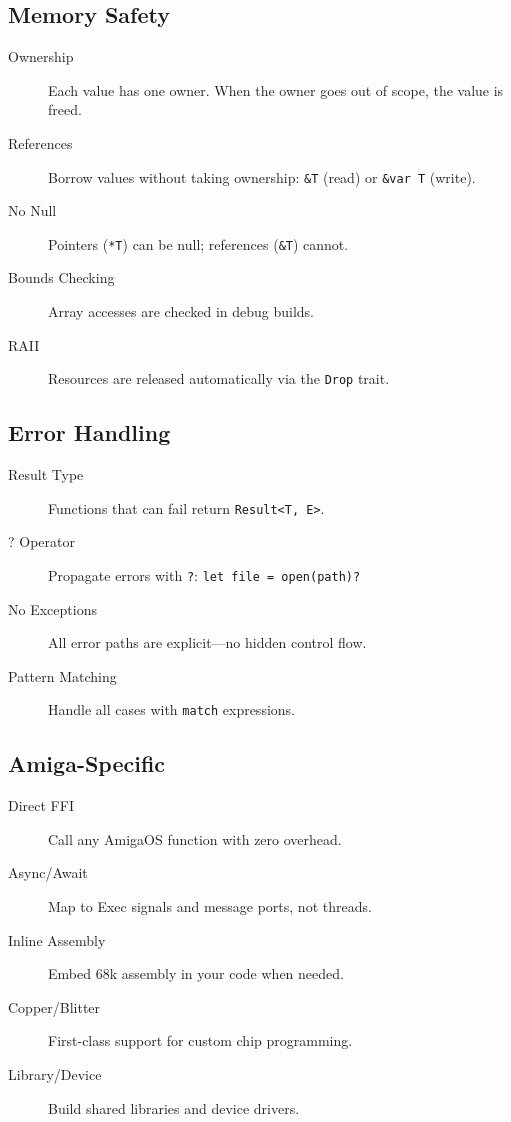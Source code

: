 \subsection{Memory Safety}

\begin{description}
    \item[Ownership] Each value has one owner. When the owner goes out of scope, the value is freed.
    \item[References] Borrow values without taking ownership: \texttt{\&T} (read) or \texttt{\&var T} (write).
    \item[No Null] Pointers (\texttt{*T}) can be null; references (\texttt{\&T}) cannot.
    \item[Bounds Checking] Array accesses are checked in debug builds.
    \item[RAII] Resources are released automatically via the \texttt{Drop} trait.
\end{description}

\subsection{Error Handling}

\begin{description}
    \item[Result Type] Functions that can fail return \texttt{Result<T, E>}.
    \item[? Operator] Propagate errors with \texttt{?}: \texttt{let file = open(path)?}
    \item[No Exceptions] All error paths are explicit---no hidden control flow.
    \item[Pattern Matching] Handle all cases with \texttt{match} expressions.
\end{description}

\subsection{Amiga-Specific}

\begin{description}
    \item[Direct FFI] Call any AmigaOS function with zero overhead.
    \item[Async/Await] Map to Exec signals and message ports, not threads.
    \item[Inline Assembly] Embed 68k assembly in your code when needed.
    \item[Copper/Blitter] First-class support for custom chip programming.
    \item[Library/Device] Build shared libraries and device drivers.
\end{description}

